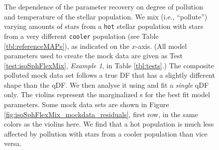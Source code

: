 \begin{figure}[!htbp]
\caption{The dependence of the parameter recovery on degree of pollution and temperature of the stellar population. We mix (i.e., ``pollute'') varying amounts of stars from a \texttt{hot} stellar population with stars from a very different \texttt{cooler} population (see Table \ref{tbl:referenceMAPs}), as indicated on the $x$-axis. (All model parameters used to create the mock data are given as Test \ref{test:isoSphFlexMix}, \emph{Example 1}, in Table \ref{tbl:tests}.) The composite polluted mock data set follows a true DF that has a slightly different shape than the qDF. We then analyse it using \RM{} and fit a \emph{single} qDF only. The violins represent the marginalized \pdf{}s for the best fit model parameters.  Some mock data sets are shown in Figure \ref{fig:isoSphFlexMix_mockdata_residuals}, first row, in the same colors as the violins here.  We find that a hot population is much less affected by pollution with stars from a cooler population than vice versa.}
\label{fig:isoSphFlexMixCont}
\end{figure}




